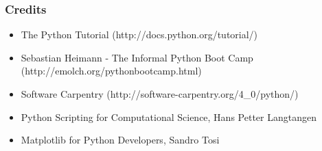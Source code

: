 \documentclass[t,9pt,compress=false,usepdftitle=false]{beamer}
\title[Python Intro]{\parbox[c][][c]{0.7\paperwidth}{\centering ObsPy workshop
2012\\
Python Introduction}}
\date[Zurich 2012-09-06]{2012-09-06}
\begin{document}
\maketitle






\begin{frame}[fragile]
\frametitle {Credits}
    \begin{itemize}
    \item The Python Tutorial (http://docs.python.org/tutorial/)
    \item Sebastian Heimann - The Informal Python Boot Camp (http://emolch.org/pythonbootcamp.html)
    \item Software Carpentry (http://software-carpentry.org/4\_0/python/)
    \item Python Scripting for Computational Science, Hans Petter Langtangen
    \item Matplotlib for Python Developers, Sandro Tosi
    \end{itemize}
\end{frame}
\end{document}
